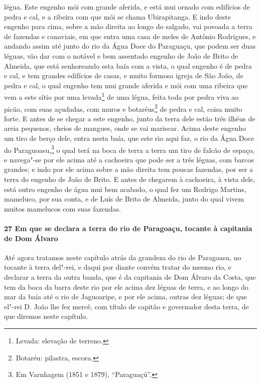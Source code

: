 \begin{linenumbers}
légua. Este engenho mói com grande aferida, e está mui ornado com edifícios de pedra e
cal, e a ribeira com que mói se chama Ubirapitanga. E indo deste engenho para cima, sobre
a mão direita ao longo do salgado, vai povoada a terra de fazendas e canaviais, em que
entra uma casa de meles de Antônio Rodrigues, e andando assim até junto do rio da Água
Doce do Paraguaçu, que podem ser duas léguas, vão dar com o notável e bem assentado
engenho de João de Brito de Almeida, que está senhoreando esta baía com a vista, o qual
engenho é de pedra e cal, e tem grandes edifícios de casas, e muito formosa igreja de São
João, de pedra e cal, o qual engenho tem mui grande aferida e mói com uma ribeira que vem
a este sítio por uma levada\footnote{ Levada: elevação de terreno.} de uma légua, feita
toda por pedra viva ao picão, com suas açudadas, com muros e botaréus\footnote{ Botaréu:
pilastra, escora.} de pedra e cal, coisa muito forte. E antes de se chegar a este engenho,
junto da terra dele estão três ilhéus de areia pequenos, cheios de mangues, onde se vai
mariscar. Acima deste engenho um tiro de berço dele, entra nesta baía, que este rio aqui
faz, o rio da Água Doce do Paraguoasu,\footnote{ Em Varnhagem (1851 e 1879),
``Paraguaçú''.} o qual terá na boca de terra a terra um tiro de falcão de espaço, e
navega"-se por ele acima até a cachoeira que pode ser a três léguas, com barcos grandes; e
indo por ele acima sobre a mão direita tem poucas fazendas, por ser a terra do engenho de
João de Brito. E antes de chegarem à cachoeira, à vista dele, está outro engenho de água
mui bem acabado, o qual fez um Rodrigo Martins, mameluco, por sua conta, e de Luís de
Brito de Almeida, junto do qual vivem muitos mamelucos com suas fazendas.

\paragraph{27 Em que se declara a terra do rio de Paragoaçu, tocante à capitania de Dom
Álvaro}\quad
Até agora tratamos neste capítulo atrás da grandeza do rio de Paragoasu, no tocante à
terra del"-rei, e daqui por diante convém tratar do mesmo rio, e declarar a terra da outra
banda, que é da capitania de Dom Álvaro da Costa, que tem da boca da barra deste rio por
ele acima dez léguas de terra, e ao longo do mar da baía até o rio de Jaguoaripe, e por
ele acima, outras dez léguas; de que el"-rei D. João lhe fez mercê, com título de capitão e
governador desta terra, de que diremos neste capítulo.


\end{linenumbers}
